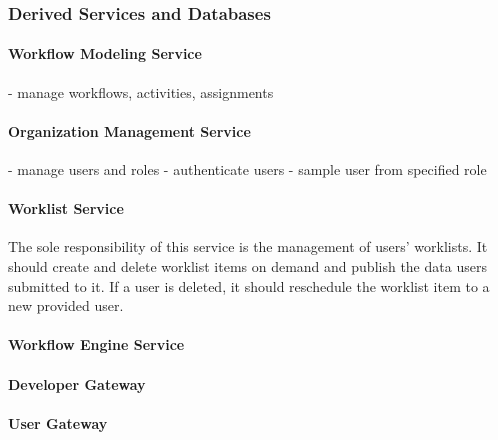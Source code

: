   \subsubsection{Derived Services and Databases} %
  \label{ssub:derived_services}

    \paragraph{Workflow Modeling Service} %
      \label{par:workflow_modeling_service}
      - manage workflows, activities, assignments

    \paragraph{Organization Management Service} %
      \label{par:organization_management_service}
      - manage users and roles
      - authenticate users
      - sample user from specified role

    \paragraph{Worklist Service} %
      \label{par:worklist_service}
      The sole responsibility of this service is the management of users' worklists. It should create and delete worklist items on demand and publish the data users submitted to it. If a user is deleted, it should reschedule the worklist item to a new provided user.

    \paragraph{Workflow Engine Service} %
      \label{par:workflow_engine_service}

    \paragraph{Developer Gateway} %
      \label{par:developer_gateway}

    \paragraph{User Gateway} %
      \label{par:user_gateway}

